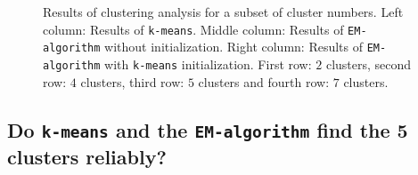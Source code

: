 \documentclass[a4paper, 12pt, titlepage]{article}
\begin{document}
\begin{figure}
	\caption{Results of clustering analysis for a subset of cluster numbers. Left column: Results of \texttt{k-means}. Middle column: Results of \texttt{EM-algorithm} without initialization. Right column: Results of \texttt{EM-algorithm} with \texttt{k-means} initialization. First row: $2$ clusters, second row: $4$ clusters, third row: $5$ clusters and fourth row: $7$ clusters.}
	\label{fig:5gaussiansClustering}
\end{figure}

\subsection{Do \texttt{k-means} and the \texttt{EM-algorithm} find the 5 clusters reliably?}
\end{document}
